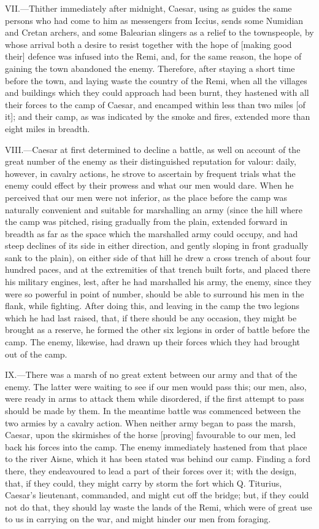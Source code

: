 VII.—Thither immediately after midnight, Caesar, using as guides the
same persons who had come to him as messengers from Iccius, sends some
Numidian and Cretan archers, and some Balearian slingers as a relief to
the townspeople, by whose arrival both a desire to resist together with
the hope of [making good their] defence was infused into the Remi, and,
for the same reason, the hope of gaining the town abandoned the enemy.
Therefore, after staying a short time before the town, and laying waste
the country of the Remi, when all the villages and buildings which they
could approach had been burnt, they hastened with all their forces to
the camp of Caesar, and encamped within less than two miles [of it]; and
their camp, as was indicated by the smoke and fires, extended more than
eight miles in breadth.

VIII.—Caesar at first determined to decline a battle, as well on
account of the great number of the enemy as their distinguished
reputation for valour: daily, however, in cavalry actions, he strove to
ascertain by frequent trials what the enemy could effect by their
prowess and what our men would dare. When he perceived that our men were
not inferior, as the place before the camp was naturally convenient and
suitable for marshalling an army (since the hill where the camp was
pitched, rising gradually from the plain, extended forward in breadth as
far as the space which the marshalled army could occupy, and had steep
declines of its side in either direction, and gently sloping in front
gradually sank to the plain), on either side of that hill he drew a
cross trench of about four hundred paces, and at the extremities of that
trench built forts, and placed there his military engines, lest, after
he had marshalled his army, the enemy, since they were so powerful in
point of number, should be able to surround his men in the flank, while
fighting. After doing this, and leaving in the camp the two legions
which he had last raised, that, if there should be any occasion, they
might be brought as a reserve, he formed the other six legions in order
of battle before the camp. The enemy, likewise, had drawn up their
forces which they had brought out of the camp.

IX.—There was a marsh of no great extent between our army and that of
the enemy. The latter were waiting to see if our men would pass this;
our men, also, were ready in arms to attack them while disordered, if
the first attempt to pass should be made by them. In the meantime battle
was commenced between the two armies by a cavalry action. When neither
army began to pass the marsh, Caesar, upon the skirmishes of the horse
[proving] favourable to our men, led back his forces into the camp. The
enemy immediately hastened from that place to the river Aisne, which it
has been stated was behind our camp. Finding a ford there, they
endeavoured to lead a part of their forces over it; with the design,
that, if they could, they might carry by storm the fort which Q.
Titurius, Caesar's lieutenant, commanded, and might cut off the bridge;
but, if they could not do that, they should lay waste the lands of the
Remi, which were of great use to us in carrying on the war, and might
hinder our men from foraging.

